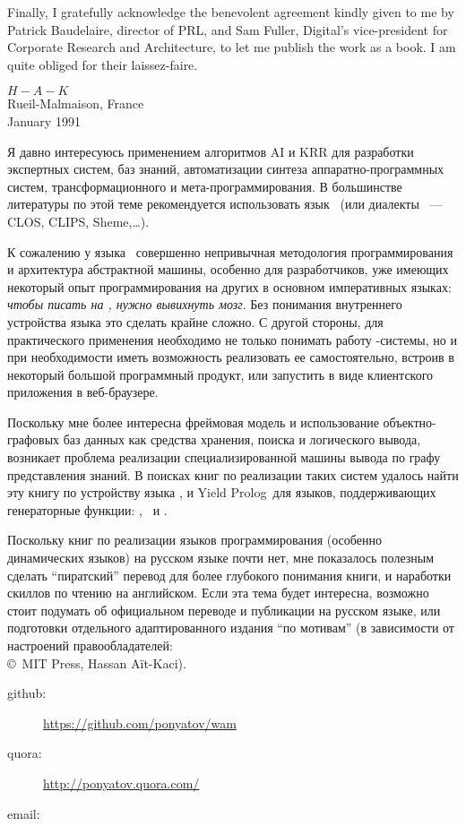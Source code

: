 Finally, I gratefully acknowledge the benevolent agreement kindly given to me by
Patrick Baudelaire, director of PRL, and Sam Fuller, Digital’s vice-president for
Corporate Research and Architecture, to let me publish the work as a book. I am
quite obliged for their laissez-faire.

\bigskip
\begin{flushright}
$H-A-K$\\
Rueil-Malmaison, France\\
January 1991
\end{flushright}

\clearpage
{}

Я давно интересуюсь применением алгоритмов AI и
KRR для разработки экспертных систем, баз знаний,
автоматизации синтеза аппаратно-програм\-мных систем\cite{bibilo},
трансформационного и
мета-программирования. В большинстве литературы по этой теме рекомендуется
использовать язык \prolog\ (или диалекты \lisp\ --- CLOS, CLIPS,
Sheme,\ldots).

К сожалению у языка \prolog\ совершенно непривычная методология программирования
и архитектура абстрактной машины, особенно для разработчиков, уже имеющих
некоторый опыт программирования на других в основном императивных языках:
\emph{чтобы писать на \prolog, нужно вывихнуть мозг}. Без понимания внутреннего
устройства языка это сделать крайне сложно.
С другой стороны, для практического применения необходимо не только понимать
работу \prolog-системы, но и при необходимости иметь возможность реализовать ее
самостоятельно, встроив в некоторый большой программный продукт, или запустить в
виде клиентского приложения в веб-браузере.

Поскольку мне более интересна фреймовая модель\cite{minsky} и использование
объектно-графовых баз данных как средства хранения, поиска и логического вывода,
возникает проблема реализации специализированной машины вывода по графу
представления знаний. В поисках книг по реализации таких систем удалось
найти эту книгу по устройству языка \prolog, и Yield
Prolog\ для языков,
поддерживающих генераторные функции: \py, \js\ и \csharp.

Поскольку книг по реализации языков программирования (особенно динамических
языков) на русском языке почти нет\cite{dragon,plai}, мне показалось полезным
сделать ``пиратский'' перевод для более глубокого понимания книги, и наработки
скиллов по чтению на английском. Если эта тема будет интересна, возможно стоит
подумать об официальном переводе и публикации на русском языке, или подготовки
отдельного адаптированного издания ``по мотивам'' (в зависимости от настроений
правообладателей:\\\copyright\ MIT Press, Hassan A\"it-Kaci).

\bigskip
\begin{description}
\item[github:] \url{https://github.com/ponyatov/wam}
\item[quora:] \url{http://ponyatov.quora.com/}
\item[email:] 
\end{description}
 